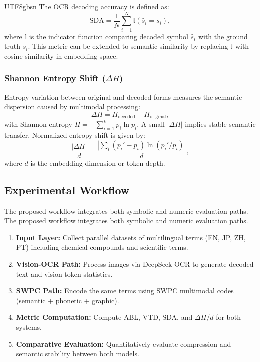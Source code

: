 \documentclass[conference]{IEEEtran}
\begin{document}
\begin{CJK*}{UTF8}{gbsn}
The OCR decoding accuracy is defined as:
\begin{equation}
\text{SDA} = \frac{1}{N} \sum_{i=1}^{N} \mathbb{I}(\hat{s}_i = s_i),
\end{equation}
where $\mathbb{I}$ is the indicator function comparing decoded symbol $\hat{s}_i$ with the ground truth $s_i$.  
This metric can be extended to semantic similarity by replacing $\mathbb{I}$ with cosine similarity in embedding space.

\subsubsection{Shannon Entropy Shift ($\Delta H$)}

Entropy variation between original and decoded forms measures the semantic dispersion caused by multimodal processing:
\begin{equation}
\Delta H = H_{\text{decoded}} - H_{\text{original}},
\end{equation}
with Shannon entropy $H = - \sum_{i=1}^{k} p_i \ln p_i$.  
A small $|\Delta H|$ implies stable semantic transfer.  
Normalized entropy shift is given by:
\begin{equation}
\frac{|\Delta H|}{d} = \frac{|\sum_i (p_i' - p_i)\ln(p_i'/p_i)|}{d},
\end{equation}
where $d$ is the embedding dimension or token depth.

\subsection{Experimental Workflow}

The proposed workflow integrates both symbolic and numeric evaluation paths. %
 The proposed workflow integrates both symbolic and numeric evaluation paths. %


\begin{enumerate}
    \item \textbf{Input Layer:} Collect parallel datasets of multilingual terms (EN, JP, ZH, PT) including chemical compounds and scientific terms.  
    \item \textbf{Vision-OCR Path:} Process images via DeepSeek-OCR to generate decoded text and vision-token statistics.  
    \item \textbf{SWPC Path:} Encode the same terms using SWPC multimodal codes (semantic + phonetic + graphic).  
    \item \textbf{Metric Computation:} Compute ABL, VTD, SDA, and $\Delta H/d$ for both systems.  
    \item \textbf{Comparative Evaluation:} Quantitatively evaluate compression and semantic stability between both models.
\end{enumerate}


\end{CJK*}
\end{document}
